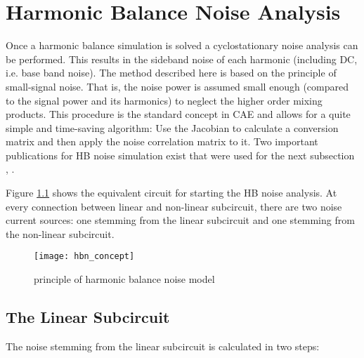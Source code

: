 %
%
%
%

\chapter{Harmonic Balance Noise Analysis}
\label{sec:hb_noise}

Once a harmonic balance simulation is solved a cyclostationary
noise analysis can
be performed. This results in the sideband noise of each harmonic
(including DC, i.e. base band noise). The method described here
is based on the principle of small-signal noise. That is, the
noise power is assumed small enough (compared to the signal power
and its harmonics) to neglect the higher order mixing products.
This procedure is the standard concept in CAE and allows for a
quite simple and time-saving algorithm: Use the Jacobian to
calculate a conversion matrix and then apply the noise correlation
matrix to it. Two important publications for HB noise simulation
exist that were used for the next subsection \cite{Roychowdhury},
\cite{Rizzoli}.

\addvspace{12pt}

Figure \ref{fig:hbn_concept} shows the equivalent circuit for
starting the HB noise analysis. At every connection between
linear and non-linear subcircuit, there are two noise current
sources: one stemming from the linear subcircuit and one
stemming from the non-linear subcircuit.

\begin{figure}[ht]
\begin{center}
\texttt{[image: hbn\_concept]}
\end{center}
\caption{principle of harmonic balance noise model}
\label{fig:hbn_concept}
\end{figure}
\FloatBarrier


\section{The Linear Subcircuit}

The noise stemming from the linear subcircuit is calculated
in two steps:

